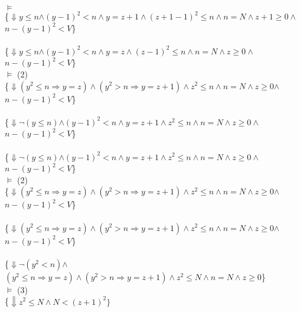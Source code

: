\documentclass[11.5pt]{article}
\begin{document}
$\vDash$ \\
\{$\Downarrow$\colorbox{NavyBlue!10}{$y \leq n$}$\land (y-1)^2<n \land y = z+1\land (z+1-1)^2 \leq n \land n=N \land z+1 \geq 0\land$\colorbox{teal!10}{$n-(y-1)^2<V$}\}\\
 \\
\{$\Downarrow$\colorbox{NavyBlue!10}{$y \leq n$}$\land (y-1)^2<n \land y = z\land (z-1)^2 \leq n \land n=N \land z \geq 0\land$\colorbox{teal!10}{$n-(y-1)^2<V$}\}\\
$\vDash$ (2) \\
\{$\Downarrow$\colorbox{blue!10}{$(y^2 \leq n \Rightarrow y = z) \land (y^2 > n \Rightarrow y = z + 1) \land z^2 \leq n \land n=N \land z \geq 0$}$\land$\colorbox{teal!10}{$n-(y-1)^2<V$}\} \\
 \\
\{$\Downarrow$\colorbox{NavyBlue!10}{$\lnot(y \leq n)$}$\land (y-1)^2<n \land y = z+ 1 \land z^2 \leq n \land n=N \land z \geq 0\land$\colorbox{teal!10}{$n-(y-1)^2<V$}\}\\
 \\
\{$\Downarrow$\colorbox{NavyBlue!10}{$\lnot(y \leq n)$}$\land (y-1)^2<n \land y = z+ 1 \land z^2 \leq n \land n=N \land z \geq 0\land$\colorbox{teal!10}{$n-(y-1)^2<V$}\}\\
$\vDash$ (2) \\
\{$\Downarrow$\colorbox{blue!10}{$(y^2 \leq n \Rightarrow y = z) \land (y^2 > n \Rightarrow y = z + 1) \land z^2 \leq n \land n=N \land z \geq 0$}$\land$\colorbox{teal!10}{$n-(y-1)^2<V$}\} \\
  \\
\{$\Downarrow$\colorbox{blue!10}{$(y^2 \leq n \Rightarrow y = z) \land (y^2 > n \Rightarrow y = z + 1) \land z^2 \leq n \land n=N \land z \geq 0$}$\land$\colorbox{teal!10}{$n-(y-1)^2<V$}\} \\
 \\
\{$\Downarrow$\colorbox{magenta!10}{$\lnot (y^2 < n)$}$\land$\colorbox{blue!10}{$(y^2 \leq n \Rightarrow y = z) \land (y^2 > n \Rightarrow y = z + 1) \land z^2 \leq N \land n=N \land z \geq 0$}\} \\
$\vDash$ (3) \\
\{$\Downarrow z^2 \leq N \land N < (z+1)^2\}$\\
\end{document}
